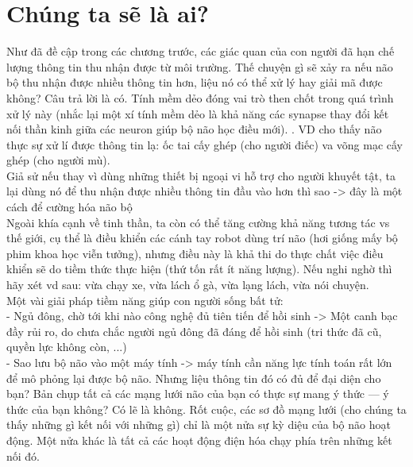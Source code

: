 \documentclass{article}
\newcommand\tab[1][1cm]{\hspace*{#1}}
\begin{document}
\section{Chúng ta sẽ là ai?}
\tab Như đã đề cập trong các chương trước, các giác quan của con người đã hạn chế lượng thông tin thu nhận 
được từ môi trường. Thế chuyện gì sẽ xảy ra nếu não bộ thu nhận được nhiều thông tin hơn, liệu nó có thể xử lý
hay giải mã được không? Câu trả lời là có. Tính mềm dẻo đóng vai trò then chốt trong quá trình xử lý này (nhắc lại
một xí tính mềm dẻo là khả năng các synapse thay đổi kết nối thần kinh giữa các neuron giúp bộ não học điều mới).
. VD cho thấy não thực sự xử lí được thông tin lạ: ốc tai cấy ghép (cho người điếc) va võng mạc cấy ghép
(cho người mù). \\
\tab Giả sử nếu thay vì dùng những thiết bị ngoại vi hỗ trợ cho người khuyết tật, ta lại dùng nó để thu nhận được
nhiều thông tin đầu vào hơn thì sao -> đây là một cách để cường hóa não bộ\\
\tab Ngoài khía cạnh về tinh thần, ta còn có thể tăng cường khả năng tương tác vs thế giới, cụ thể là điều khiển các
cánh tay robot dùng trí não (hơi giống mấy bộ phim khoa học viễn tưởng), nhưng điều này là khả thi do thực chất việc 
điều khiển sẽ do tiềm thức thực hiện (thứ tốn rất ít năng lượng). Nếu nghi nghờ thì hãy xét vd sau: vừa chạy xe, vừa 
lách ổ gà, vừa lạng lách, vừa nói chuyện.\\
\tab Một vài giải pháp tiềm năng giúp con người sống bất tử:\\
\tab - Ngủ đông, chờ tới khi nào công nghệ đủ tiên tiến để hồi sinh -> Một canh bạc đầy rủi ro, do chưa chắc người ngủ 
đông đã đáng để hồi sinh (tri thức đã cũ, quyền lực không còn, ...)\\
\tab - Sao lưu bộ não vào một máy tính -> máy tính cần năng lực tính toán rất lớn để mô phỏng lại được bộ não. Nhưng liệu thông tin đó có đủ để
đại diện cho bạn? Bản chụp tất cả các mạng lưới não của bạn có thực sự mang
ý thức — ý thức của bạn không? Có lẽ là không. Rốt cuộc, các sơ đồ mạng
lưới (cho chúng ta thấy những gì kết nối với những gì) chỉ là một nửa sự kỳ
diệu của bộ não hoạt động. Một nửa khác là tất cả các hoạt động điện hóa chạy
phía trên những kết nối đó.\\
\end{document}

